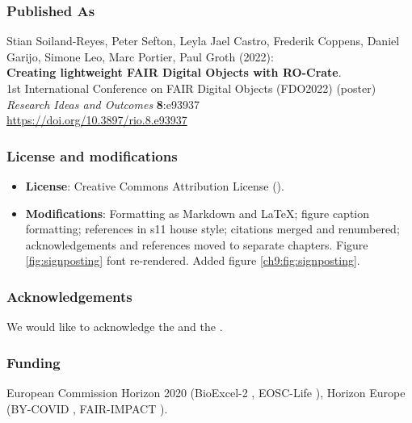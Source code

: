 \subsubsection*{Published As}
Stian Soiland-Reyes, Peter Sefton, Leyla Jael Castro, Frederik Coppens,
Daniel Garijo, Simone Leo, Marc Portier, Paul Groth (2022):\\
\textbf{Creating lightweight FAIR Digital Objects with RO-Crate}.\\
1st International Conference on FAIR Digital Objects (FDO2022) (poster)\\
\emph{Research Ideas and Outcomes} \textbf{8}:e93937\\
\url{https://doi.org/10.3897/rio.8.e93937}


\subsubsection*{License and modifications}

\begin{itemize}
\tightlist
\item
  \textbf{License}: Creative Commons Attribution License
  ().
\item
  \textbf{Modifications}: Formatting as Markdown and LaTeX; figure caption
  formatting; references in s11 house style; citations merged and renumbered; 
  acknowledgements and references moved to separate chapters. 
  Figure \ref{fig:signposting} font re-rendered. Added figure \ref{ch9:fig:signposting}.
\end{itemize}

\subsubsection*{Acknowledgements}

We would like to acknowledge the
 and the
.

\subsubsection*{Funding}

European Commission Horizon 2020 (BioExcel-2
, EOSC-Life
), Horizon
Europe (BY-COVID
,
FAIR-IMPACT
).

